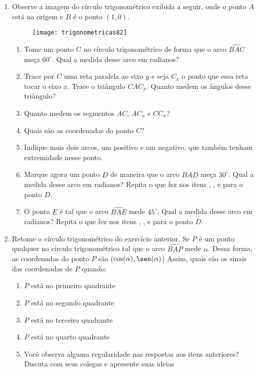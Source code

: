 \begin{enumerate}
\item Observe a imagem do círculo trigonométrico exibida a seguir, onde o ponto $A$ está na origem e $B$ é o ponto $(1,0)$.

\begin{figure}[H]
\centering

\texttt{[image: trigonometricas82]}
\end{figure}

\begin{enumerate}
\item 	Tome um ponto C no círculo trigonométrico de forma que o arco $\widehat{BAC}$ meça $60^{\circ}$. Qual a medida desse arco em radianos?
\item Trace por $C$ uma reta paralela ao eixo $y$ e seja $C_x$ o ponto que essa reta tocar o eixo $x$. Trace o triângulo $CAC_x$. Quanto medem os ângulos desse triângulo?
\item Quanto medem os segmentos $AC$, $AC_x$ e $CC_x$?
\item Quais são as coordenadas do ponto $C$?
\item Indique mais dois arcos, um positivo e um negativo, que também tenham extremidade nesse ponto.
\item Marque agora um ponto $D$ de maneira que o arco $\widehat{BAD}$ meça $30^{\circ}$. Qual a medida desse arco em radianos? Repita o que fez nos itens , ,  e  para o ponto $D$.
\item O ponto $E$ é tal que o arco $\widehat{BAE}$ mede $45^{\circ}$. Qual a medida desse arco em radianos? Repita o que fez nos itens , ,  e  para o ponto $D$.
\end{enumerate}

\item Retome o círculo trigonométrico do exercício anterior. Se $P$ é um ponto qualquer no círculo trigonométrico tal que o arco $\widehat{BAP}$ mede $\alpha$. Dessa forma, as coordenadas do ponto $P$ são ($\cos(\alpha), \sen(\alpha)$) Assim, quais são os sinais das coordenadas de $P$ quando:
\begin{enumerate}
\item $P$ está no primeiro quadrante
\item $P$ está no segundo quadrante
\item $P$ está no terceiro quadrante
\item $P$ está no quarto quadrante
\item Você observa alguma regularidade nas respostas aos itens anteriores? Discuta com seus colegas e apresente suas ideias
\end{enumerate}


\end{enumerate}
